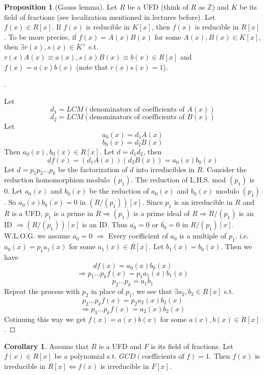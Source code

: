 \documentclass[12pt]{article}
\theoremstyle{definition}
\newtheorem{cor}{Corollary}
\newtheorem{prop}{Proposition}
\newenvironment{proofs}[1][\proofname]{%
  \begin{proof}[#1]$ $\par\nobreak\ignorespaces
}{%
  \end{proof}
}
\begin{document}
\begin{prop}[Gauss lemma]
	Let $R$ be a UFD (think of $R$ as $\mathbb{Z}$) and $K$ be its field of fractions (see localization mentioned in lectures before). Let $f(x) \in R[x]$. If $f(x)$ is reducible in $K[x]$, then $f(x)$ is reducible in $R[x]$. To be more precise, if $f(x) = A(x) B(x)$ for some $A(x), B(x) \in K[x]$, then $\exists r(x), s(x) \in K^\times$ s.t. $r(x) A(x) \equiv a(x), s(x) B(x) \equiv b(x) \in R[x]$  and $f(x) = a(x) b(x)$ (note that $r(x) s(x) = 1$).
\end{prop}

\begin{proofs}
	Let
	$$d_1 = LCM(\text{denominators of coefficients of } A(x))$$
	$$d_2 = LCM(\text{denominators of coefficients of } B(x))$$
	Let
	$$a_0(x) = d_1 A(x)$$
	$$b_0(x) = d_2 B(x)$$
	Then $a_0(x), b_0(x) \in R[x]$. Let $d = d_1 d_2$, then
	$$d f(x) = (d_1 A(x)) (d_2 B(x))  = a_0(x) b_0(x)$$
	Let $d = p_1 p_2 \hdots p_k$ be the factorization of $d$ into irreducibles in $R$. Consider the reduction homomorphism modulo $(p_1)$. The reduction of L.H.S. mod $(p_1)$ is 0. Let $\overline{a_0(x)}$ and $\overline{b_0(x)}$ be the reduction of $a_0(x)$ and $b_0(x)$ modulo $(p_1)$. So $\overline{a_0(x)} \overline{b_0(x)} = 0$ in $(R/(p_1))[x]$. Since $p_1$ is an irreducible in $R$ and $R$ is a UFD, $p_1$ is a prime in $R \Rightarrow (p_1)$ is a prime ideal of $R \Rightarrow R/(p_1)$ is an ID $\Rightarrow (R/(p_1))[x]$ is an ID. Thus $\overline{a_0} = 0$ or $\overline{b_0} = 0$ in $R/(p_1)[x]$. W.L.O.G. we assume $\overline{a_0} = 0$ $\Rightarrow$ Every coefficient of $a_0$ is a multiple of $p_1$. i.e. $a_0(x) = p_1 a_1(x)$ for some $a_1(x) \in R[x]$. Let $b_1(x) = b_0(x)$. Then we have
	$$d f(x) = a_0(x) b_0(x)$$
	$$\Rightarrow p_1 \hdots p_k f(x) = p_1 a_1(x) b_1(x)$$
	$$p_2 \hdots p_k = a_1 b_1$$
	Repeat the process with $p_2$ in place of $p_1$, we see that $\exists a_2, b_2 \in R[x]$ s.t.
	$$p_2 \hdots p_k f(x) = p_2 a_2(x) b_2(x)$$
	$$\Rightarrow p_3 \hdots p_k f(x) = a_2(x) b_2(x)$$
	Cotinuing this way we get $f(x) = a(x) b(x)$ for some $a(x), b(x) \in R[x]$.
\end{proofs}

\begin{cor}
	Assume that $R$ is a UFD and $F$ is its field of fractions. Let $f(x) \in R[x]$ be a polynomial s.t. $GCD(\text{coefficients of }f) = 1$. Then $f(x)$ is irreducible in $R[x] \Leftrightarrow f(x)$ is irreducible in $F[x]$.
\end{cor}
\end{document}
